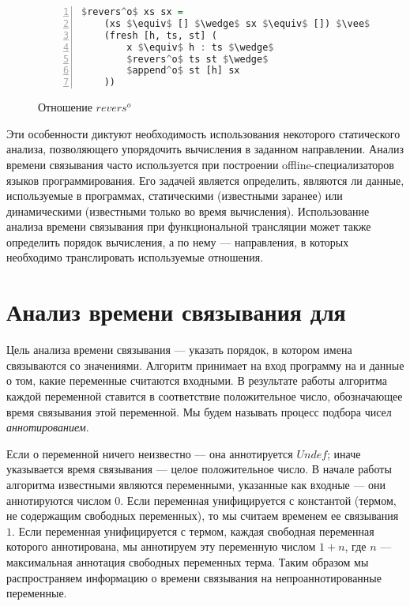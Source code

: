 \documentclass[conference,american,russian]{IEEEtran}
\begin{document}
\begin{figure}[h!]
  \begin{center}
  \begin{minipage}{0.35\textwidth}
  \begin{lstlisting}[language=Haskell, frame=single, numbers=left,numberstyle=\small, escapechar=|]
  $revers^o$ xs sx =
    (xs $\equiv$ [] $\wedge$ sx $\equiv$ []) $\vee$
    (fresh [h, ts, st] (
        x $\equiv$ h : ts $\wedge$
        $revers^o$ ts st $\wedge$
        $append^o$ st [h] sx
    ))
    \end{lstlisting}
  \end{minipage}
  \end{center}
  \caption{Отношение $revers^o$}
  \label{lst:reversoDEF}
\end{figure}

Эти особенности диктуют необходимость использования некоторого статического анализа, позволяющего упорядочить вычисления в заданном направлении. 
Анализ времени связывания часто используется при построении offline-специализаторов языков программирования. 
Его задачей является определить, являются ли данные, используемые в программах, статическими (известными заранее) или динамическими (известными только во время вычисления).
Использование анализа времени связывания при функциональной трансляции может также определить порядок вычисления, а по нему --- направления, в которых необходимо транслировать используемые отношения. 

\section{Анализ времени связывания для \miniKanren{}}\label{bta}

Цель анализа времени связывания --- указать порядок, в котором имена связываются со значениями.
Алгоритм принимает на вход программу на \miniKanren{} и данные о том, какие переменные считаются входными. 
В результате работы алгоритма каждой переменной ставится в соответствие положительное число, обозначающее время связывания этой переменной.
Мы будем называть процесс подбора чисел \emph{аннотированием}.

Если о переменной ничего неизвестно --- она аннотируется $Undef$; иначе указывается время связывания --- целое положительное число.
В начале работы алгоритма известными являются переменными, указанные как входные --- они аннотируются числом $0$.
Если переменная унифицируется с константой (термом, не содержащим свободных переменных), то мы считаем временем ее связывания $1$. 
Если переменная унифицируется с термом, каждая свободная переменная которого аннотирована, мы аннотируем эту переменную числом $1+n$, где $n$ --- максимальная аннотация свободных переменных терма. 
Таким образом мы распространяем информацию о времени связывания на непроаннотированные переменные.
\end{document}

